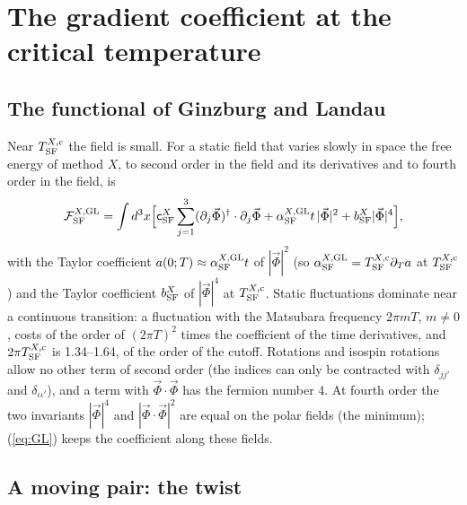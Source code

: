 \documentclass[aps,prd,onecolumn,superscriptaddress,nofootinbib,floatfix,longbibliography]{revtex4-2}
\newcommand{\SF}{{\rm SF}}
\begin{document}
\section{The gradient coefficient at the critical temperature}
\label{sec:gradient}

\subsection{The functional of Ginzburg and Landau}

Near $T^{X,{\rm c}}_\SF$ the field is small. For a static field that varies slowly in space the free energy of method $X$, to second
order in the field and its derivatives and to fourth order in the field, is
\begin{equation}
\mathcal F^{X,{\rm GL}}_\SF=\int d^3x\Big[\mathsf c^X_\SF\sum_{j=1}^3(\partial_j\vec\Phi)^\dagger\cdot\partial_j\vec\Phi+\alpha^{X,{\rm GL}}_\SF t\,|\vec\Phi|^2+b^X_\SF|\vec\Phi|^4\Big],
\label{eq:GL}
\end{equation}
with the Taylor coefficient $a(0;T)\approx\alpha^{X,{\rm GL}}_\SF t$ of $|\vec\Phi|^2$ (so $\alpha^{X,{\rm GL}}_\SF=T^{X,{\rm c}}_\SF\partial_Ta$ at
$T^{X,{\rm c}}_\SF$) and the Taylor coefficient $b^X_\SF$ of $|\vec\Phi|^4$ at $T^{X,{\rm c}}_\SF$. Static fluctuations dominate near a continuous
transition: a fluctuation with the Matsubara frequency $2\pi mT$, $m\ne0$, costs of the order of $(2\pi T)^2$ times the coefficient of
the time derivatives, and $2\pi T^{X,{\rm c}}_\SF$ is 1.34\mbox{--}1.64, of the order of the cutoff. Rotations and isospin rotations allow no
other term of second order (the indices can only be contracted with $\delta_{jj'}$ and $\delta_{\iota\iota'}$), and a term with
$\vec\Phi\cdot\vec\Phi$ has the fermion number 4. At fourth order the two invariants $|\vec\Phi|^4$ and $|\vec\Phi\cdot\vec\Phi|^2$ are equal on
the polar fields (the minimum); (\ref{eq:GL}) keeps the coefficient along these fields.

\subsection{A moving pair: the twist}
\end{document}
